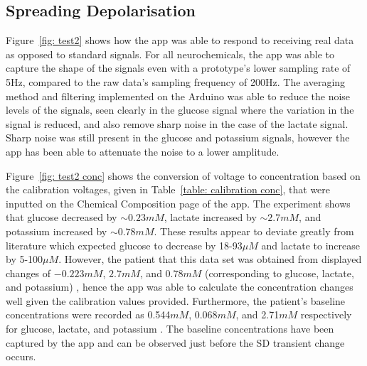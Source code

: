 \subsection{Spreading Depolarisation}

Figure~\ref{fig: test2} shows how the app was able to respond to receiving real data as opposed to standard signals. For all neurochemicals, the app was able to capture the shape of the signals even with a prototype's lower sampling rate of 5Hz, compared to the raw data's sampling frequency of 200Hz. The averaging method and filtering implemented on the Arduino was able to reduce the noise levels of the signals, seen clearly in the glucose signal where the variation in the signal is reduced, and also remove sharp noise in the case of the lactate signal. Sharp noise was still present in the glucose and potassium signals, however the app has been able to attenuate the noise to a lower amplitude.

Figure~\ref{fig: test2 conc} shows the conversion of voltage to concentration based on the calibration voltages, given in Table~\ref{table: calibration conc}, that were inputted on the Chemical Composition page of the app. The experiment shows that glucose decreased by $\sim0.23 mM$, lactate increased by $\sim2.7 mM$, and potassium increased by $\sim0.78 mM$. These results appear to deviate greatly from literature which expected glucose to decrease by 18-93$\mu M$ and lactate to increase by 5-100$\mu M$. However, the patient that this data set was obtained from displayed changes of $-0.223mM$, $2.7mM$, and $0.78mM$ (corresponding to glucose, lactate, and potassium) \cite{Rogers2017}, hence the app was able to calculate the concentration changes well given the calibration values provided. Furthermore, the patient's baseline concentrations were recorded as 0.544$mM$, 0.068$mM$, and 2.71$mM$ respectively for glucose, lactate, and potassium \cite{Rogers2017}. The baseline concentrations have been captured by the app and can be observed just before the SD transient change occurs.




